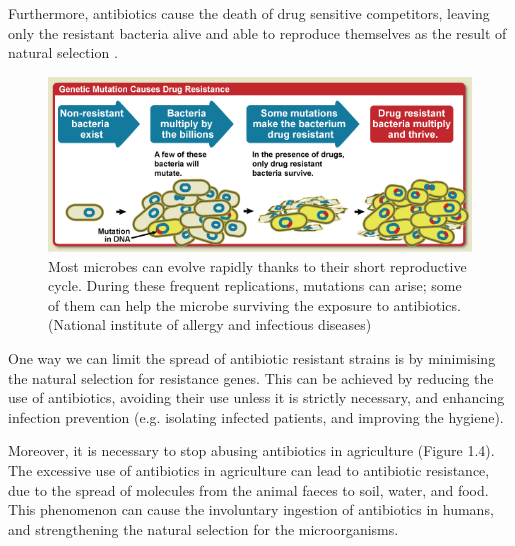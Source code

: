 \documentclass[11pt]{report}
\begin{document}
\clearpage
Furthermore, antibiotics cause the death of drug sensitive competitors, leaving only the resistant bacteria alive and able to reproduce themselves as the result of natural selection \cite{doi:10.1093/emph/eou024}.

\begin{figure}[htp]
\centering
\includegraphics[scale=0.57]{immagini gamalero/Bacteria_Resistance.png}
\caption{Most microbes can evolve rapidly thanks to their short reproductive cycle. During these frequent replications, mutations can arise; some of them can help the microbe surviving the exposure to antibiotics. (National institute of allergy and infectious diseases)}
\label{}
\end{figure}

One way we can limit the spread of antibiotic resistant strains is by minimising the natural selection for resistance genes.
This can be achieved by reducing the use of antibiotics, avoiding their use unless it is strictly necessary, and enhancing infection prevention (e.g. isolating infected patients, and improving the hygiene).

Moreover, it is necessary to stop abusing antibiotics in agriculture \cite{Spellberg2014} \cite{doi:10.1093/emph/eou024} (Figure 1.4).
The excessive use of antibiotics in agriculture can lead to antibiotic resistance, due to the spread of molecules from the animal faeces to soil, water, and food. This phenomenon can cause the  involuntary ingestion of antibiotics in humans, and strengthening the natural selection for the microorganisms.
\end{document}
